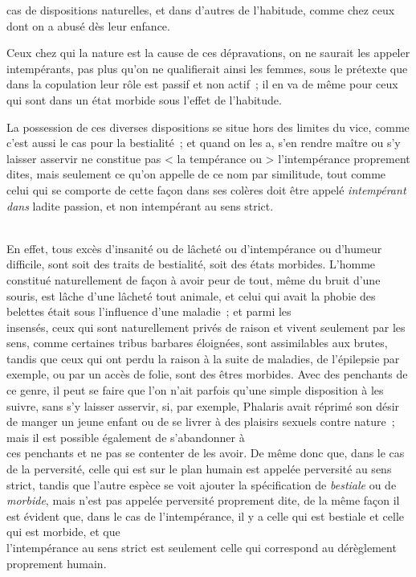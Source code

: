 \documentclass[french,twoside]{book} %
\begin{document}
cas de dispositions naturelles, et dans d’autres de l’habitude, comme chez ceux dont on a abusé dès leur enfance.\par
Ceux chez qui la nature est la cause de ces dépravations, on ne saurait les appeler intempérants, pas plus qu’on ne qualifierait ainsi les femmes, sous le prétexte que dans la copulation leur rôle est passif et non actif ; il en va de même pour ceux qui sont dans un état morbide sous l’effet de l’habitude.\par
 La possession de ces diverses dispositions se situe hors des limites du vice, comme c’est aussi le cas pour la bestialité ; et quand on les a, s’en rendre maître ou s’y laisser asservir ne constitue pas < la tempérance ou > l’intempérance proprement dites, mais seulement ce qu’on appelle de ce nom par similitude, tout comme celui qui se comporte de cette façon dans ses colères doit être appelé {\itshape intempérant dans} ladite passion, et non intempérant au sens strict.\par
\\
En effet, tous excès d’insanité ou de lâcheté ou d’intempérance ou d’humeur difficile, sont soit des traits de bestialité, soit des états morbides. L’homme constitué naturellement de façon à avoir peur de tout, même du bruit d’une souris, est lâche d’une lâcheté tout animale, et celui qui avait la phobie des belettes était sous l’influence d’une maladie ; et parmi les \\
insensés, ceux qui sont naturellement privés de raison et vivent seulement par les sens, comme certaines tribus barbares éloignées, sont assimilables aux brutes, tandis que ceux qui ont perdu la raison à la suite de maladies, de l’épilepsie par exemple, ou par un accès de folie, sont des êtres morbides. Avec des penchants de ce genre, il peut se faire que l’on n’ait parfois qu’une simple disposition à les suivre, sans s’y laisser asservir, si, par exemple, Phalaris avait réprimé son désir de manger un jeune enfant ou de se livrer à des plaisirs sexuels contre nature ; mais il est possible également de s’abandonner à \\
ces penchants et ne pas se contenter de les avoir. De même donc que, dans le cas de la perversité, celle qui est sur le plan humain est appelée perversité au sens strict, tandis que l’autre espèce se voit ajouter la spécification de {\itshape bestiale} ou de {\itshape morbide}, mais n’est pas appelée perversité proprement dite, de la même façon il est évident que, dans le cas de l’intempérance, il y a celle qui est bestiale et celle qui est morbide, et que \\
l’intempérance au sens strict est seulement celle qui correspond au dérèglement proprement humain.
\end{document}
